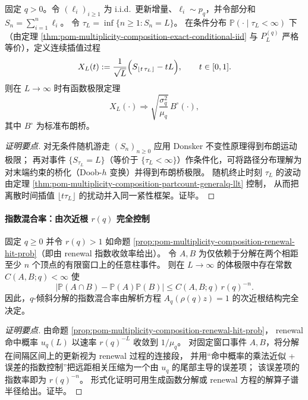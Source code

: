 \begin{theorem}\label{thm:pom-multiplicity-composition-brown-bridge-invariance}
固定 \(q>0\)。令 \((\ell_i)_{i\ge 1}\) 为 i.i.d.\ 更新增量、\(\ell_i\sim p_q\)，并令部分和 \(S_n=\sum_{i=1}^n\ell_i\)。
令 \(\tau_L=\inf\{n\ge 1:S_n=L\}\)。
在条件分布 \(\mathbb{P}(\cdot\mid\tau_L<\infty)\) 下（由定理 \ref{thm:pom-multiplicity-composition-exact-conditional-iid} 与 \(P_L^{(q)}\) 严格等价），定义连续插值过程
\[
X_L(t):=\frac{1}{\sqrt{L}}\Bigl(S_{\lfloor t\,\tau_L\rfloor}-tL\Bigr),\qquad t\in[0,1].
\]
则在 \(L\to\infty\) 时有函数极限定理
\[
X_L(\cdot)\Longrightarrow \sqrt{\frac{\sigma_q^2}{\mu_q}}\,B^\circ(\cdot),
\]
其中 \(B^\circ\) 为标准布朗桥。
\end{theorem}
\begin{proof}[证明要点]
对无条件随机游走 \((S_n)_{n\ge 0}\) 应用 Donsker 不变性原理得到布朗运动极限；
再对事件 \(\{S_{\tau_L}=L\}\)（等价于 \(\{\tau_L<\infty\}\)）作条件化，可将路径分布理解为对末端约束的桥化（Doob-\(h\) 变换）并得到布朗桥极限。
随机终止时刻 \(\tau_L\) 的波动由定理 \ref{thm:pom-multiplicity-composition-partcount-generalq-llt} 控制，
从而把离散时间插值 \(\lfloor t\tau_L\rfloor\) 的扰动并入同一紧性框架。证毕。
\end{proof}

\paragraph{指数混合率：由次近根 \texorpdfstring{$r(q)$}{r(q)} 完全控制}
\begin{theorem}\label{thm:pom-multiplicity-composition-exponential-mixing-generalq}
固定 \(q\ge 0\) 并令 \(r(q)>1\) 如命题 \ref{prop:pom-multiplicity-composition-renewal-hit-prob}（即由 renewal 指数收敛率给出）。
令 \(A,B\) 为仅依赖于分解在两个相距至少 \(n\) 个顶点的有限窗口上的任意柱事件。
则在 \(L\to\infty\) 的体极限中存在常数 \(C(A,B;q)<\infty\) 使
\[
\boxed{\;
\bigl|\mathbb{P}(A\cap B)-\mathbb{P}(A)\mathbb{P}(B)\bigr|
\le C(A,B;q)\,r(q)^{-n}.\;}
\]
因此，\(q\)-倾斜分解的指数混合率由解析方程 \(A_q(\rho(q)z)=1\) 的次近根结构完全决定。
\end{theorem}
\begin{proof}[证明要点]
由命题 \ref{prop:pom-multiplicity-composition-renewal-hit-prob}，
renewal 命中概率 \(u_q(L)\) 以速率 \(r(q)^{-L}\) 收敛到 \(1/\mu_q\)。
对固定窗口事件 \(A,B\)，将分解在间隔区间上的更新视为 renewal 过程的连接段，
并用“命中概率的乘法近似 + 误差的指数控制”把远距相关压缩为一个由 \(u_q\) 的尾部主导的误差项；
该误差项的指数率即为 \(r(q)^{-n}\)。
形式化证明可用生成函数分解或 renewal 方程的解算子谱半径给出。证毕。
\end{proof}

\endinput

